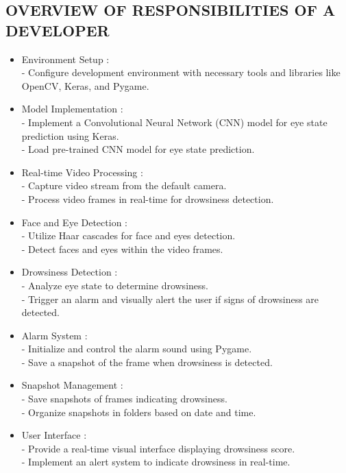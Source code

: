 \documentclass[12pt]{article}
\begin{document}
\subsection{OVERVIEW OF RESPONSIBILITIES OF A DEVELOPER}


\begin{itemize}
\item Environment Setup :\\
   - Configure development environment with necessary tools and libraries like OpenCV, Keras, and Pygame.\\

\item Model Implementation :\\
   - Implement a Convolutional Neural Network (CNN) model for eye state prediction using Keras.\\
   - Load pre-trained CNN model for eye state prediction.\\

\item Real-time Video Processing :\\
   - Capture video stream from the default camera.\\
   - Process video frames in real-time for drowsiness detection.\\

\item Face and Eye Detection :\\
   - Utilize Haar cascades for face and eyes detection.\\
   - Detect faces and eyes within the video frames.\\

\item Drowsiness Detection :\\
   - Analyze eye state to determine drowsiness.\\
   - Trigger an alarm and visually alert the user if signs of drowsiness are detected.\\

\item Alarm System :\\
   - Initialize and control the alarm sound using Pygame.\\
   - Save a snapshot of the frame when drowsiness is detected.\\

\item Snapshot Management :\\
   - Save snapshots of frames indicating drowsiness.\\
   - Organize snapshots in folders based on date and time.\\

\item User Interface :\\
   - Provide a real-time visual interface displaying drowsiness score.\\
   - Implement an alert system to indicate drowsiness in real-time.\\
\end{itemize}
\newpage
\end{document}
